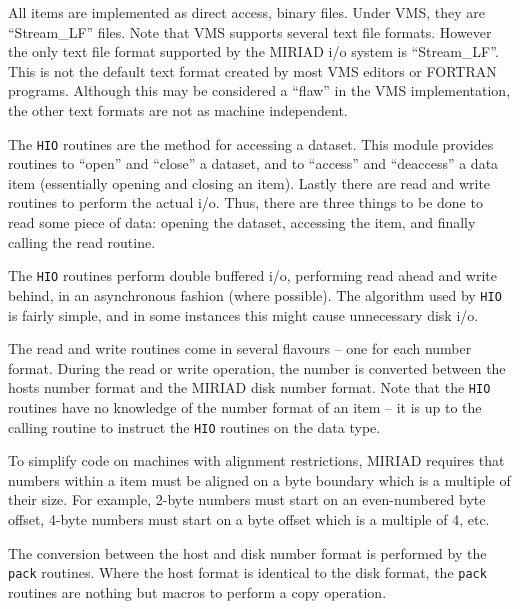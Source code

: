 All items are implemented as direct access, binary files. Under VMS, they
are ``Stream\_LF'' files. Note that VMS supports several text file formats.
However the only text file format supported by the MIRIAD i/o system
is ``Stream\_LF''. This is not the default text format created by
most VMS editors or FORTRAN programs. Although this may be considered a ``flaw''
in the VMS implementation, the other text formats are not as
machine independent.

The {\tt HIO} routines are the method for accessing a dataset. This module
provides routines to ``open'' and ``close'' a dataset, and to ``access''
and ``deaccess'' a data item (essentially opening and closing an item).
Lastly there are read and write routines to perform the actual i/o. Thus,
there are three things to be done to read some piece of data: opening the
dataset, accessing the item, and finally calling the read routine.


The {\tt HIO} routines perform double buffered i/o, performing read ahead
and write behind, in an asynchronous fashion (where possible).
The algorithm used by {\tt HIO} is fairly simple, and in some instances
this might cause unnecessary disk i/o.


The read and write routines come in several flavours -- one for each
number format. During the read or write operation, the number is converted
between the hosts number format and the MIRIAD disk number format.
Note that the {\tt HIO} routines have no knowledge of the number format
of an item -- it is up to the calling routine to instruct the {\tt HIO}
routines on the data type.

To simplify code on machines with alignment restrictions, MIRIAD requires that
numbers within a item must be aligned on a byte boundary which is a multiple
of their size. For example, 2-byte numbers must start on an even-numbered
byte offset, 4-byte numbers must start on a byte offset which is a multiple
of 4, etc. 

The conversion between the host and disk number format is performed by
the {\tt pack} routines. Where the host format is identical
to the disk format, the {\tt pack} routines are nothing but macros to
perform a copy operation.

